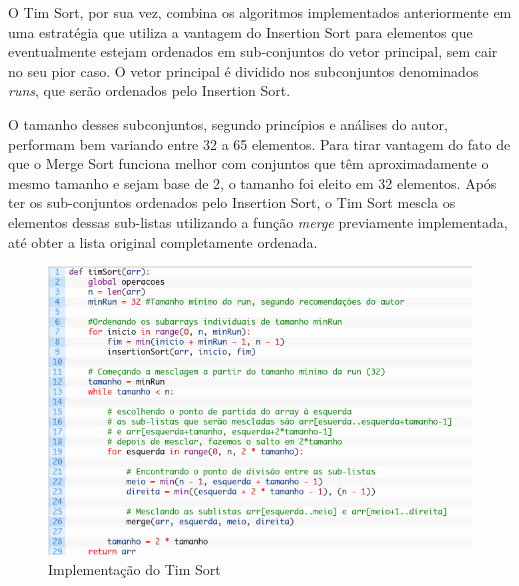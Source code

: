 O Tim Sort, por sua vez, combina os algoritmos implementados anteriormente em uma estratégia que utiliza a vantagem do Insertion Sort para elementos que eventualmente estejam ordenados em sub-conjuntos do vetor principal, sem cair no seu pior caso. O vetor principal é dividido nos subconjuntos denominados \textit{runs}, que serão ordenados pelo Insertion Sort. 

O tamanho desses subconjuntos, segundo princípios e análises do autor, performam bem variando entre 32 a 65 elementos. Para tirar vantagem do fato de que o Merge Sort funciona melhor com conjuntos que têm aproximadamente o mesmo tamanho e sejam base de 2, o tamanho foi eleito em 32 elementos. Após ter os sub-conjuntos ordenados pelo Insertion Sort, o Tim Sort mescla os elementos dessas sub-listas utilizando a função \textit{merge} previamente implementada, até obter a lista original completamente ordenada.

\begin{figure}[!htb]
\centering
\includegraphics[width=15cm]{img/codigo4.png}
\caption{Implementação do Tim Sort}
\label{fig:codigo4}
\end{figure}
